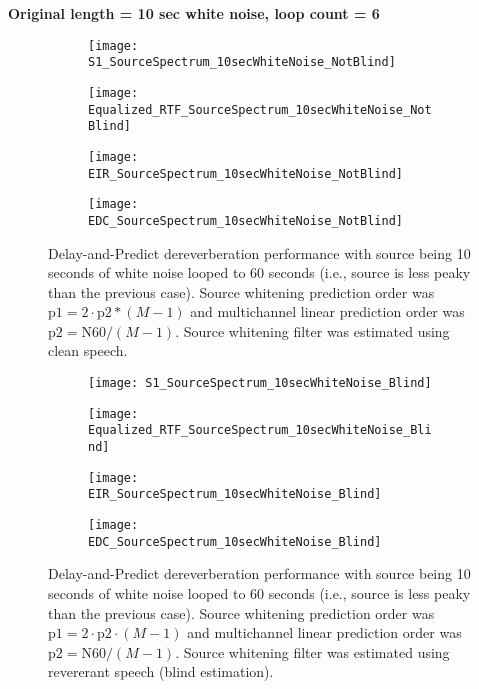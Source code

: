 \textbf{Original length = 10 sec white noise, loop count = 6}

\begin{figure}[H]
	\centering
	\begin{subfigure}[b]{0.49\textwidth}
		\centering
		\texttt{[image: S1\_SourceSpectrum\_10secWhiteNoise\_NotBlind]}
	\end{subfigure}
	\hfill
	\begin{subfigure}[b]{0.49\textwidth}
		\centering
		\texttt{[image: Equalized\_RTF\_SourceSpectrum\_10secWhiteNoise\_NotBlind]}
	\end{subfigure}
	\hfill
	\begin{subfigure}[b]{0.49\textwidth}
		\centering
		\texttt{[image: EIR\_SourceSpectrum\_10secWhiteNoise\_NotBlind]}
	\end{subfigure}
	\hfill
	\begin{subfigure}[b]{0.49\textwidth}
		\centering
		\texttt{[image: EDC\_SourceSpectrum\_10secWhiteNoise\_NotBlind]}
	\end{subfigure}
	\hfill
	\caption{Delay-and-Predict dereverberation performance with source being 10 seconds of white noise looped to 60 seconds (i.e., source is less peaky than the previous case). Source whitening prediction order was $\mathrm{p1} = 2 \cdot \mathrm{p2} * (M-1)$ and multichannel linear prediction order was $\mathrm{p2} = \mathrm{N60} / (M-1)$. Source whitening filter was estimated using clean speech.}
	\label{fig:params_source_spectrum_10sec_not_blind}
\end{figure}

\begin{figure}[H]
	\centering
	\begin{subfigure}[b]{0.49\textwidth}
		\centering
		\texttt{[image: S1\_SourceSpectrum\_10secWhiteNoise\_Blind]}
	\end{subfigure}
	\hfill
	\begin{subfigure}[b]{0.49\textwidth}
		\centering
		\texttt{[image: Equalized\_RTF\_SourceSpectrum\_10secWhiteNoise\_Blind]}
	\end{subfigure}
	\hfill
	\begin{subfigure}[b]{0.49\textwidth}
		\centering
		\texttt{[image: EIR\_SourceSpectrum\_10secWhiteNoise\_Blind]}
	\end{subfigure}
	\hfill
	\begin{subfigure}[b]{0.49\textwidth}
		\centering
		\texttt{[image: EDC\_SourceSpectrum\_10secWhiteNoise\_Blind]}
	\end{subfigure}
	\hfill
	\caption{Delay-and-Predict dereverberation performance with source being 10 seconds of white noise looped to 60 seconds (i.e., source is less peaky than the previous case). Source whitening prediction order was $\mathrm{p1} = 2 \cdot \mathrm{p2} \cdot (M-1)$ and multichannel linear prediction order was $\mathrm{p2} = \mathrm{N60} / (M-1)$. Source whitening filter was estimated using revererant speech (blind estimation).}
	\label{fig:params_source_spectrum_10sec_blind}
\end{figure}


